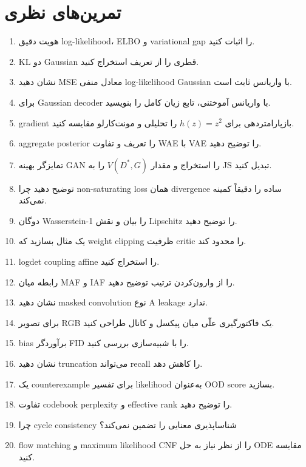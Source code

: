 \documentclass[12pt,openany,oneside]{book}
\begin{document}
\section{تمرین‌های نظری}
\begin{enumerate}
\item هویت دقیق log-likelihood، ELBO و variational gap را اثبات کنید.
\item KL دو Gaussian قطری را از تعریف استخراج کنید.
\item نشان دهید MSE معادل منفی log-likelihood Gaussian با واریانس ثابت است.
\item برای Gaussian decoder با واریانس آموختنی، تابع زیان کامل را بنویسید.
\item gradient بازپارامتردهی برای $h(z)=z^2$ را تحلیلی و مونت‌کارلو مقایسه کنید.
\item aggregate posterior را تعریف و تفاوت WAE با VAE را توضیح دهید.
\item تمایزگر بهینه GAN را استخراج و مقدار $V(D^*,G)$ را به JS تبدیل کنید.
\item توضیح دهید چرا non-saturating loss همان divergence ساده را دقیقاً کمینه نمی‌کند.
\item دوگان Wasserstein-1 را بیان و نقش Lipschitz را توضیح دهید.
\item یک مثال بسازید که weight clipping ظرفیت critic را محدود کند.
\item logdet coupling affine را استخراج کنید.
\item رابطه میان MAF و IAF را از وارون‌کردن ترتیب توضیح دهید.
\item نشان دهید masked convolution نوع A leakage ندارد.
\item برای تصویر RGB یک فاکتورگیری علّی میان پیکسل و کانال طراحی کنید.
\item bias برآوردگر FID را با شبیه‌سازی بررسی کنید.
\item نشان دهید truncation می‌تواند recall را کاهش دهد.
\item یک counterexample برای تفسیر likelihood به‌عنوان OOD score بسازید.
\item تفاوت codebook perplexity و effective rank را توضیح دهید.
\item چرا cycle consistency شناساپذیری معنایی را تضمین نمی‌کند؟
\item flow matching و maximum likelihood CNF را از نظر نیاز به حل ODE مقایسه کنید.
\end{enumerate}
\end{document}
